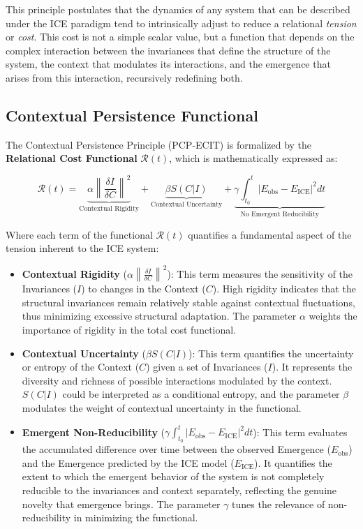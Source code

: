 \documentclass{article}
\begin{document}
\bigskip
This principle postulates that the dynamics of any system that can be described under the ICE paradigm tend to intrinsically adjust to reduce a relational \textit{tension} or \textit{cost}. This cost is not a simple scalar value, but a function that depends on the complex interaction between the invariances that define the structure of the system, the context that modulates its interactions, and the emergence that arises from this interaction, recursively redefining both.
\subsection{Contextual Persistence Functional}

The Contextual Persistence Principle (PCP-ECIT) is formalized by the \textbf{Relational Cost Functional} $\mathcal{R}(t)$, which is mathematically expressed as:

\begin{equation}
\mathcal{R}(t) = \underbrace{\alpha \left\| \frac{\delta I}{\delta C} \right\|^2}_{\text{Contextual Rigidity}} + \underbrace{\beta S(C|I)}_{\text{Contextual Uncertainty}} + \underbrace{\gamma \int_{t_0}^t |E_{\text{obs}} - E_{\text{ICE}}|^2 dt}_{\text{No Emergent Reducibility}}
\label{eq:R}
\end{equation}

Where each term of the functional $\mathcal{R}(t)$ quantifies a fundamental aspect of the tension inherent to the ICE system:
\begin{itemize}
\item \textbf{Contextual Rigidity} ($\alpha \left\| \frac{\delta I}{\delta C} \right\|^2$): This term measures the sensitivity of the Invariances ($I$) to changes in the Context ($C$). High rigidity indicates that the structural invariances remain relatively stable against contextual fluctuations, thus minimizing excessive structural adaptation. The parameter $\alpha$ weights the importance of rigidity in the total cost functional.
\item \textbf{Contextual Uncertainty} ($\beta S(C|I)$): This term quantifies the uncertainty or entropy of the Context ($C$) given a set of Invariances ($I$). It represents the diversity and richness of possible interactions modulated by the context. $S(C|I)$ could be interpreted as a conditional entropy, and the parameter $\beta$ modulates the weight of contextual uncertainty in the functional.
\item \textbf{Emergent Non-Reducibility} ($\gamma \int_{t_0}^t |E_{\text{obs}} - E_{\text{ICE}}|^2 dt$): This term evaluates the accumulated difference over time between the observed Emergence ($E_{\text{obs}}$) and the Emergence predicted by the ICE model ($E_{\text{ICE}}$). It quantifies the extent to which the emergent behavior of the system is not completely reducible to the invariances and context separately, reflecting the genuine novelty that emergence brings. The parameter $\gamma$ tunes the relevance of non-reducibility in minimizing the functional.\end{itemize}
\end{document}
